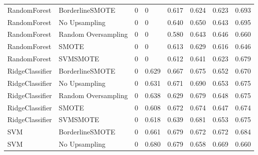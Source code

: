 \begin{tabular}{llllllll}
                RandomForest &     BorderlineSMOTE &     0 &                         0 &                 0.617 &                  0.624 &                                   0.623 &     0.693 \\
                RandomForest &       No Upsampling &     0 &                         0 &                 0.640 &                  0.650 &                                   0.643 &     0.695 \\
                RandomForest & Random Oversampling &     0 &                         0 &                 0.580 &                  0.643 &                                   0.646 &     0.660 \\
                RandomForest &               SMOTE &     0 &                         0 &                 0.613 &                  0.629 &                                   0.616 &     0.646 \\
                RandomForest &            SVMSMOTE &     0 &                         0 &                 0.612 &                  0.641 &                                   0.623 &     0.679 \\
             RidgeClassifier &     BorderlineSMOTE &     0 &                     0.629 &                 0.667 &                  0.675 &                                   0.652 &     0.670 \\
             RidgeClassifier &       No Upsampling &     0 &                     0.631 &                 0.671 &                  0.690 &                                   0.653 &     0.675 \\
             RidgeClassifier & Random Oversampling &     0 &                     0.638 &                 0.629 &                  0.679 &                                   0.648 &     0.675 \\
             RidgeClassifier &               SMOTE &     0 &                     0.608 &                 0.672 &                  0.674 &                                   0.647 &     0.674 \\
             RidgeClassifier &            SVMSMOTE &     0 &                     0.618 &                 0.639 &                  0.681 &                                   0.653 &     0.675 \\
                         SVM &     BorderlineSMOTE &     0 &                     0.661 &                 0.679 &                  0.672 &                                   0.672 &     0.684 \\
                         SVM &       No Upsampling &     0 &                     0.680 &                 0.679 &                  0.658 &                                   0.669 &     0.660 \\

\end{tabular}

